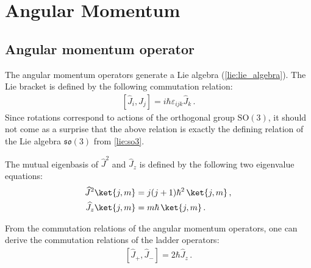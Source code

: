 \section{Angular Momentum}
\subsection{Angular momentum operator}

    \begin{property}
       The angular momentum operators generate a Lie algebra (\cref{lie:lie_algebra}). The Lie bracket is defined by the following commutation relation:
       \begin{gather}
           \label{angular_momentum:commutation}
           \left[\widehat{J}_i,\widehat{J}_j\right] = i\hbar\varepsilon_{ijk}\widehat{J}_k\,.
       \end{gather}
       Since rotations correspond to actions of the orthogonal group $\mathrm{SO}(3)$, it should not come as a surprise that the above relation is exactly the defining relation of the Lie algebra $\mathfrak{so}(3)$ from \cref{lie:so3}.
    \end{property}

    \begin{property}
       The mutual eigenbasis of $\widehat{J}^2$ and $\widehat{J}_z$ is defined by the following two eigenvalue equations:
       \begin{align}
           \label{angular_momentum:j}
           \widehat{J}^2\ket{j,m} &= j(j+1)\hbar^2\,\ket{j,m}\,,\\
           \label{angular_momentum:m}
           \widehat{J}_z\ket{j,m} &= m\hbar\,\ket{j,m}\,.
        \end{align}
    \end{property}

    \begin{result}
        From the commutation relations of the angular momentum operators, one can derive the commutation relations of the ladder operators:
        \begin{gather}
            \left[\widehat{J}_+,\widehat{J}_-\right] = 2\hbar\widehat{J}_z\,.
        \end{gather}
    \end{result}

